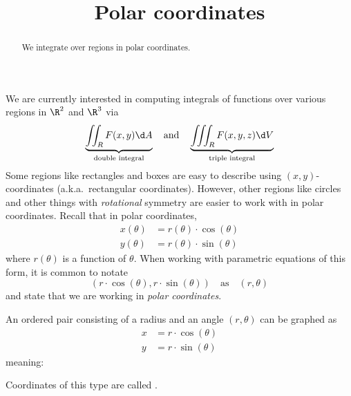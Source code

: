 \documentclass{ximera}
\title[Dig-In:]{Polar coordinates}
\begin{document}
\begin{abstract}
  We integrate over regions in polar coordinates.
\end{abstract}
\maketitle

We are currently interested in computing integrals of functions over
various regions in $\R^2$ and $\R^3$ via
\[
\underbrace{\iint_R F(x,y) \d A}_{\text{double integral}} \quad\text{and}\quad \underbrace{\iiint_R F(x,y,z) \d V}_{\text{triple integral}}
\]
Some regions like rectangles and boxes are easy to describe using
$(x,y)$-coordinates (a.k.a.\ rectangular coordinates). However, other
regions like circles and other things with \textit{rotational}
symmetry are easier to work with in polar coordinates. Recall that in
polar coordinates,
\begin{align*} 
  x(\theta) &= r(\theta) \cdot \cos(\theta)\\
  y(\theta) &= r(\theta) \cdot \sin(\theta)
\end{align*}
where $r(\theta)$ is a function of $\theta$.  When working with
parametric equations of this form, it is common to notate
\[
(r \cdot \cos(\theta), r\cdot \sin(\theta)) \quad\text{as}\quad (r,\theta)
\]
and state that we are working in \textit{polar coordinates}.

\begin{definition}
  An ordered pair consisting of a radius and an angle $(r,\theta)$
  can be graphed as
  \begin{align*}
    x &= r\cdot \cos(\theta)\\
    y &= r\cdot \sin(\theta)
  \end{align*}
  meaning:
  \begin{image}[2in]
  \end{image}
  Coordinates of this type are called .
\end{definition}
\end{document}
